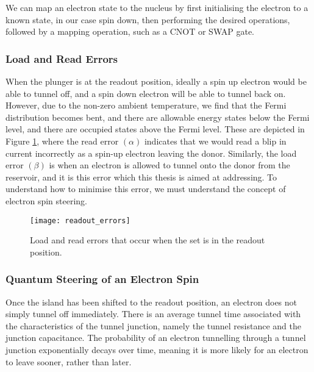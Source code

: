 		We can map an electron state to the nucleus by first initialising the electron to a known state, in our case spin down, then performing the desired operations, followed by a mapping operation, such as a CNOT or SWAP gate.
	\subsubsection{Load and Read Errors}
		\label{sec::load_error}
		When the plunger is at the readout position, ideally a spin up electron would be able to tunnel off, and a spin down electron will be able to tunnel back on. However, due to the non-zero ambient temperature, we find that the Fermi distribution becomes bent, and there are allowable energy states below the Fermi level, and there are occupied states above the Fermi level. These are depicted in Figure \ref{fig::errors}, where the read error $(\alpha)$ indicates that we would read a blip in current incorrectly as a spin-up electron leaving the donor. Similarly, the load error $(\beta)$ is when an electron is allowed to tunnel onto the donor from the reservoir, and it is this error which this thesis is aimed at addressing. To understand how to minimise this error, we must understand the concept of electron spin steering.
		
		\begin{figure}[htbp!]
			\centering
			\texttt{[image: readout\_errors]}
			\caption[Load and red errors in the \gls{set} readout position]{Load and read errors that occur when the \gls{set} is in the readout position.\cite{electron_spin_silicon}}
			\label{fig::errors}
		\end{figure}
		
	\subsubsection{Quantum Steering of an Electron Spin}
	
		Once the island has been shifted to the readout position, an electron does not simply tunnel off immediately. There is an average tunnel time associated with the characteristics of the tunnel junction, namely the tunnel resistance and the junction capacitance. The probability of an electron tunnelling through a tunnel junction exponentially decays over time, meaning it is more likely for an electron to leave sooner, rather than later. \\
		

